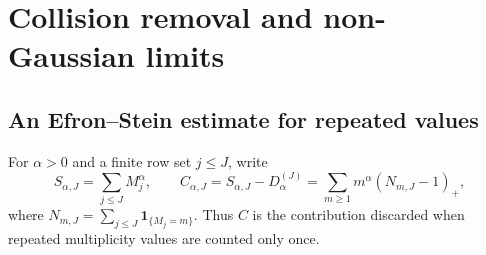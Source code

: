 \documentclass[11pt,letterpaper]{article}
\numberwithin{equation}{section}
\theoremstyle{definition}\newtheorem{definition}[theorem]{Definition}
\theoremstyle{remark}\newtheorem{remark}[theorem]{Remark}
\newcommand{\ind}{\mathbf 1}
\begin{document}
\section{Collision removal and non-Gaussian limits}\label{dmv:fl:sec:large}

\subsection{An Efron--Stein estimate for repeated values}
For $\alpha>0$ and a finite row set $j\le J$, write
\[
 S_{\alpha,J}=\sum_{j\le J}M_j^\alpha,\qquad
 C_{\alpha,J}=S_{\alpha,J}-D_\alpha^{(J)}
             =\sum_{m\ge1}m^\alpha(N_{m,J}-1)_+,
\]
where $N_{m,J}=\sum_{j\le J}\ind_{\{M_j=m\}}$.
Thus $C$ is the contribution discarded when repeated multiplicity
values are counted only once.
\end{document}
